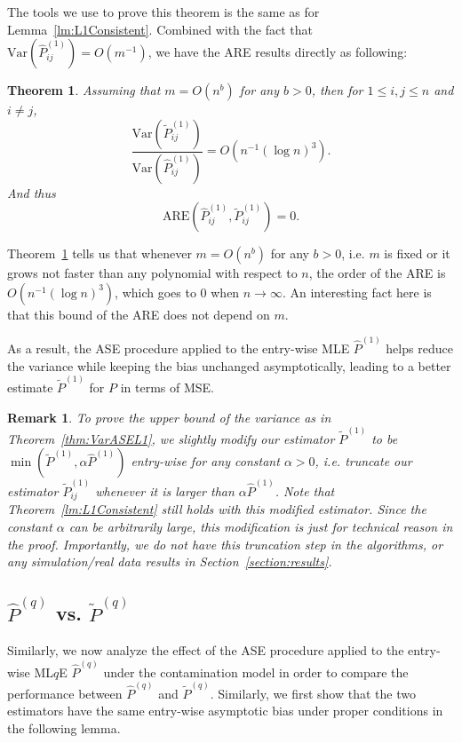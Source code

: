 \documentclass[a4paper]{article}
\newtheorem{theorem}[fact]{Theorem}
\newtheorem{remark}[fact]{Remark}
\renewcommand{\hat}{\widehat}
\begin{document}
The tools we use to prove this theorem is the same as for Lemma~\ref{lm:L1Consistent}. Combined with the fact that $\mathrm{Var}(\hat{P}_{ij}^{(1)}) = O(m^{-1})$, we have the ARE results directly as following:
\begin{theorem}
\label{thm:AREL1}
Assuming that $m = O(n^b)$ for any $b > 0$,  then for $1 \le i, j \le n$ and $i \ne j$,
\[
	\frac{\mathrm{Var}(\widetilde{P}_{ij}^{(1)})}{\mathrm{Var}(\hat{P}_{ij}^{(1)})}
    = O(n^{-1} (\log n)^3).
\]
And thus
\[
	\mathrm{ARE}(\hat{P}_{ij}^{(1)}, \widetilde{P}_{ij}^{(1)}) = 0.
\]
\end{theorem}

Theorem~\ref{thm:AREL1} tells us that whenever $m = O(n^b)$ for any $b > 0$, i.e. $m$ is fixed or it grows not faster than any polynomial with respect to $n$, the order of the ARE is $O(n^{-1} (\log n)^3)$, which goes to 0 when $n \to \infty$. An interesting fact here is that this bound of the ARE does not depend on $m$.

As a result, the ASE procedure applied to the entry-wise MLE $\hat{P}^{(1)}$ helps reduce the variance while keeping the bias unchanged asymptotically, leading to a better estimate $\widetilde{P}^{(1)}$ for $P$ in terms of MSE.

\begin{remark}
\label{remark:var1}
To prove the upper bound of the variance as in Theorem~\ref{thm:VarASEL1}, we slightly modify our estimator $\widetilde{P}^{(1)}$ to be $\min(\widetilde{P}^{(1)}, \alpha \hat{P}^{(1)})$ entry-wise for any constant $\alpha > 0$, i.e. truncate our estimator $\widetilde{P}^{(1)}_{ij}$ whenever it is larger than $\alpha \hat{P}^{(1)}$. Note that Theorem~\ref{lm:L1Consistent} still holds with this modified estimator. Since the constant $\alpha$ can be arbitrarily large, this modification is just for technical reason in the proof. Importantly, we do not have this truncation step in the algorithms, or any simulation/real data results in Section~\ref{section:results}.
\end{remark}


\subsection{$\hat{P}^{(q)}$ vs. $\widetilde{P}^{(q)}$}

Similarly, we now analyze the effect of the ASE procedure applied to the entry-wise ML$q$E $\hat{P}^{(q)}$ under the contamination model in order to compare the performance between $\hat{P}^{(q)}$ and $\widetilde{P}^{(q)}$. Similarly, we first show that the two estimators have the same entry-wise asymptotic bias under proper conditions in the following lemma.
\end{document}
